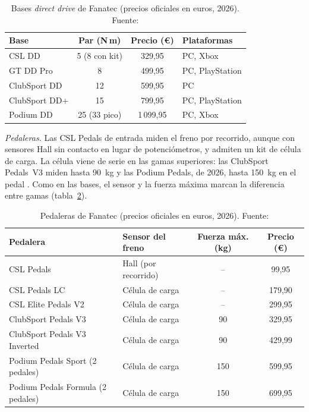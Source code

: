 \begin{table}[htbp]
	\centering
	\caption[Bases \textit{direct drive} de Fanatec (precios oficiales en euros, 2026)]{Bases \textit{direct drive} de Fanatec (precios oficiales en euros, 2026). Fuente: \parencite{fanatec_web}}
	\label{tab:fanatec}
	\begin{tabular}{|l|c|c|l|}
		\hline
		\textbf{Base} & \textbf{Par (N\,m)} & \textbf{Precio (\euro)} & \textbf{Plataformas} \\
		\hline
		CSL DD        & 5 (8 con kit) & 329,95    & PC, Xbox \\
		GT DD Pro     & 8             & 499,95    & PC, PlayStation \\
		ClubSport DD  & 12            & 599,95    & PC \\
		ClubSport DD+ & 15            & 799,95    & PC, PlayStation \\
		Podium DD     & 25 (33 pico)  & 1\,099,95 & PC, Xbox \\
		\hline
	\end{tabular}
\end{table}

\textit{Pedaleras.} Las CSL Pedals de entrada miden el freno por recorrido, aunque con sensores Hall sin contacto en lugar de potenciómetros, y admiten un kit de célula de carga. La célula viene de serie en las gamas superiores: las ClubSport Pedals~V3 miden hasta 90~kg y las Podium Pedals, de 2026, hasta 150~kg en el pedal \parencite{fanatec_web}. Como en las bases, el sensor y la fuerza máxima marcan la diferencia entre gamas (tabla~\ref{tab:fanatec-pedales}).

\begin{table}[htbp]
	\centering
	\caption[Pedaleras de Fanatec (precios oficiales en euros, 2026)]{Pedaleras de Fanatec (precios oficiales en euros, 2026). Fuente: \parencite{fanatec_web}}
	\label{tab:fanatec-pedales}
	\small
	\begin{tabular}{|l|l|c|c|}
		\hline
		\textbf{Pedalera} & \textbf{Sensor del freno} & \textbf{Fuerza máx. (kg)} & \textbf{Precio (\euro)} \\
		\hline
		CSL Pedals                        & Hall (por recorrido) & --  & 99,95 \\
		CSL Pedals LC                     & Célula de carga      & --  & 179,90 \\
		CSL Elite Pedals V2               & Célula de carga      & --  & 299,95 \\
		ClubSport Pedals V3               & Célula de carga      & 90  & 329,95 \\
		ClubSport Pedals V3 Inverted      & Célula de carga      & 90  & 429,99 \\
		Podium Pedals Sport (2 pedales)   & Célula de carga      & 150 & 599,95 \\
		Podium Pedals Formula (2 pedales) & Célula de carga      & 150 & 699,95 \\
		\hline
	\end{tabular}
\end{table}

